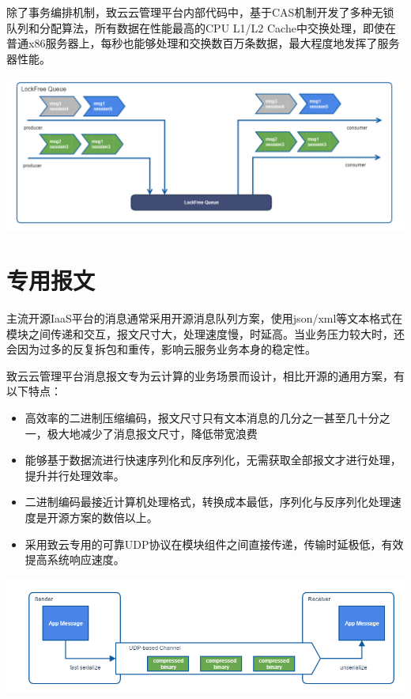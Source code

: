 \documentclass[letterpaper,10pt]{sphinxmanual}
\begin{document}
除了事务编排机制，致云云管理平台内部代码中，基于CAS机制开发了多种无锁队列和分配算法，所有数据在性能最高的CPU L1/L2 Cache中交换处理，即使在普通x86服务器上，每秒也能够处理和交换数百万条数据，最大程度地发挥了服务器性能。

\includegraphics{2_2_2_lockfree_queue.png}


\section{专用报文}
\label{index:id11}
主流开源IaaS平台的消息通常采用开源消息队列方案，使用json/xml等文本格式在模块之间传递和交互，报文尺寸大，处理速度慢，时延高。当业务压力较大时，还会因为过多的反复拆包和重传，影响云服务业务本身的稳定性。

致云云管理平台消息报文专为云计算的业务场景而设计，相比开源的通用方案，有以下特点：
\begin{itemize}
\item {} 
高效率的二进制压缩编码，报文尺寸只有文本消息的几分之一甚至几十分之一，极大地减少了消息报文尺寸，降低带宽浪费

\item {} 
能够基于数据流进行快速序列化和反序列化，无需获取全部报文才进行处理，提升并行处理效率。

\item {} 
二进制编码最接近计算机处理格式，转换成本最低，序列化与反序列化处理速度是开源方案的数倍以上。

\item {} 
采用致云专用的可靠UDP协议在模块组件之间直接传递，传输时延极低，有效提高系统响应速度。

\end{itemize}

\includegraphics{2_3_dedicated_datagram.png}
\end{document}
